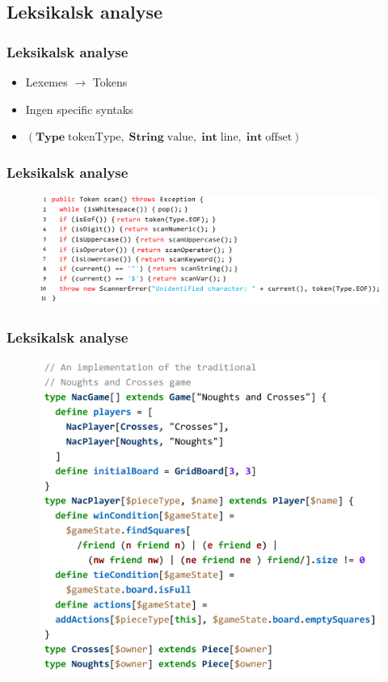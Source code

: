 \subsection{Leksikalsk analyse}
\begin{frame}
  \frametitle{Leksikalsk analyse}

  \begin{itemize}
    \item Lexemes $\rightarrow$ Tokens
    \item Ingen specific syntaks
    \item $(\mathbf{Type}\; \mathrm{tokenType},\; \mathbf{String}\;
      \mathrm{value},\; \mathbf{int}\; \mathrm{line},\; \mathbf{int}\;
      \mathrm{offset})$
  \end{itemize}

\end{frame}

\begin{frame}
  \frametitle{Leksikalsk analyse}

  \begin{figure}
    \includegraphics[width=1\linewidth]{billeder/scan-metode}
  \end{figure}

\end{frame}



\begin{frame}
  \frametitle{Leksikalsk analyse}

  \begin{figure}
    \includegraphics[width=0.6\linewidth]{billeder/leksikalsk-eksempel}
  \end{figure}

\end{frame}


